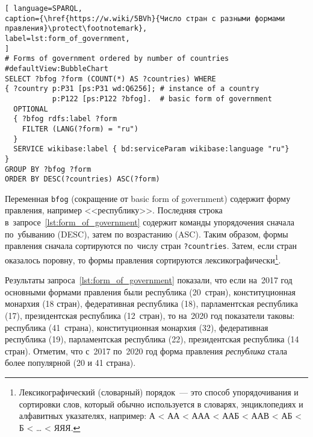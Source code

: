 \begin{lstlisting}[ language=SPARQL, 
caption={\href{https://w.wiki/5BVh}{Число стран с разными формами правления}\protect\footnotemark},
label=lst:form_of_government, 
]
# Forms of government ordered by number of countries
#defaultView:BubbleChart
SELECT ?bfog ?form (COUNT(*) AS ?countries) WHERE 
{ ?country p:P31 [ps:P31 wd:Q6256]; # instance of a country
           p:P122 [ps:P122 ?bfog].  # basic form of government
  OPTIONAL 
  { ?bfog rdfs:label ?form
    FILTER (LANG(?form) = "ru")
  }
  SERVICE wikibase:label { bd:serviceParam wikibase:language "ru"}
}
GROUP BY ?bfog ?form
ORDER BY DESC(?countries) ASC(?form)
\end{lstlisting}


Переменная \lstinline|bfog| (сокращение от basic form of government) 
содержит форму правления, например <<республику>>. 
Последняя строка в~запросе~\ref{lst:form_of_government} содержит команды упорядочения 
сначала по~убыванию (DESC), затем по возрастанию (ASC). 
Таким образом, формы правления сначала сортируются по~числу стран \lstinline|?countries|. 
Затем, если стран оказалось поровну, то формы правления сортируются лексикографически\footnote{%
%
Лексикографический (словарный) порядок~--- это способ упорядочивания и сортировки слов, 
который обычно используется в словарях, энциклопедиях и алфавитных указателях, 
например: А < АА < ААА < ААБ < ААВ < АБ < Б < … < ЯЯЯ.%
}.


Результаты запроса~\ref{lst:form_of_government} 
показали, что если на~2017 год основными формами правления были 
республика (20~стран), конституционная монархия (18 стран), федеративная республика (18), парламентская республика (17), президентская республика (12~стран), 
то на~2020 год показатели таковы: республика (41~страна), конституционная монархия (32), федеративная республика (19), парламентская республика (22), президентская республика (14 стран). 
%
Отметим, что с~2017 по~2020 год 
форма правления \emph{республика} стала более популярной (20 и 41 страна). 

